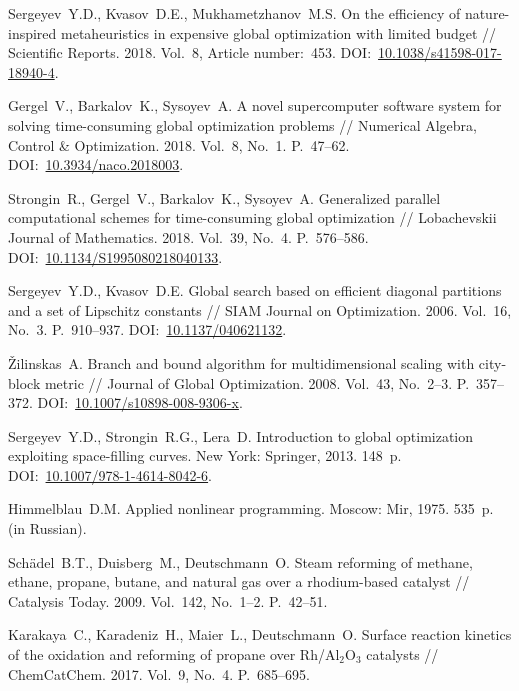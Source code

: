 \documentclass{cmi}
\begin{document}
\begin{biblio_lat}
Sergeyev~Y.D., Kvasov~D.E., Mukhametzhanov~M.S. On the efficiency of nature-inspired metaheuristics in expensive global optimization with limited budget // Scientific Reports. 2018. Vol.~8, Article number:~453. DOI:~\href{http://dx.doi.org/10.1038/s41598-017-18940-4}{10.1038/s41598-017-18940-4}.

Gergel~V., Barkalov~K., Sysoyev~A. A novel supercomputer software system for solving time-consuming global optimization problems // Numerical Algebra, Control \& Optimization. 2018. Vol.~8, No.~1. P.~47--62. DOI:~\href{http://dx.doi.org/10.3934/naco.2018003}{10.3934/naco.2018003}.

Strongin~R., Gergel~V., Barkalov~K., Sysoyev~A. Generalized parallel computational schemes for time-consuming global optimization // Lobachevskii Journal of Mathematics. 2018. Vol.~39, No.~4. P.~576--586. DOI:~\href{http://dx.doi.org/10.1134/S1995080218040133}{10.1134/S1995080218040133}.

Sergeyev~Y.D., Kvasov~D.E. Global search based on efficient diagonal partitions and a set of Lipschitz constants // SIAM Journal on Optimization. 2006. Vol.~16, No.~3. P.~910--937. DOI:~\href{http://dx.doi.org/10.1137/040621132}{10.1137/040621132}.

Žilinskas~A. Branch and bound algorithm for multidimensional scaling with city-block metric // Journal of Global Optimization. 2008. Vol.~43, No.~2--3. P.~357--372. DOI:~\href{http://dx.doi.org/10.1007/s10898-008-9306-x}{10.1007/s10898-008-9306-x}.

Sergeyev~Y.D., Strongin~R.G., Lera~D. Introduction to global optimization exploiting space-filling curves. New York: Springer, 2013. 148~p. DOI:~\href{http://dx.doi.org/10.1007/978-1-4614-8042-6}{10.1007/978-1-4614-8042-6}.

Himmelblau~D.M. Applied nonlinear programming. Moscow: Mir, 1975. 535~p. (in Russian).

Schädel~B.T., Duisberg~M., Deutschmann~O. Steam reforming of methane, ethane, propane, butane, and natural gas over a rhodium-based catalyst // Catalysis Today. 2009. Vol.~142, No.~1--2. P.~42--51.

Karakaya~C., Karadeniz~H., Maier~L., Deutschmann~O. Surface reaction kinetics of the oxidation and reforming of propane over Rh/Al$_2$O$_3$ catalysts // ChemCatChem. 2017. Vol.~9, No.~4. P.~685--695.


\end{biblio_lat}
\end{document}
